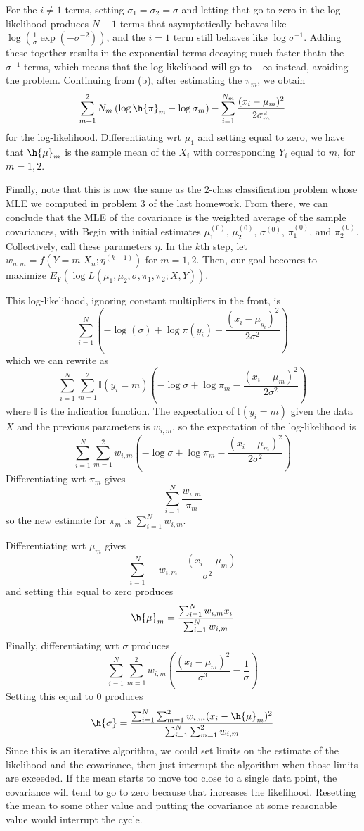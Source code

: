 \documentclass{article}
\begin{document}
For the $i\neq1$ terms, setting $\sigma_1=\sigma_2=\sigma$ and letting that go to zero in the log-likelihood produces $N-1$ terms that asymptotically behaves like $\log\left(\frac{1}{\sigma}\exp(-\sigma^{-2})\right)$, and the $i=1$ term still behaves like $\log\sigma^{-1}$. Adding these together results in the exponential terms decaying much faster thatn the $\sigma^{-1}$ terms, which means that the log-likelihood will go to $-\infty$ instead, avoiding the problem.
Continuing from (b), after estimating the $\pi_m$, we obtain 
\[\sum_{m=1}^2N_m\left(\log\h{\pi}_m-\log\sigma_m\right)-\sum_{i=1}^{N_m}\frac{(x_i-\mu_m)^2}{2\sigma_m^2}\]
for the log-likelihood. Differentiating wrt $\mu_1$ and setting equal to zero, we have that $\h{\mu}_m$ is the sample mean of the $X_i$ with corresponding $Y_i$ equal to $m$, for $m=1,2$.

Finally, note that this is now the same as the $2$-class classification problem whose MLE we computed in problem 3 of the last homework. From there, we can conclude that the MLE of the covariance is the weighted average of the sample covariances, with 
Begin with initial estimates $\mu_1^{(0)}$, $\mu_2^{(0)}$, $\sigma^{(0)}$, $\pi_1^{(0)}$, and $\pi_2^{(0)}$. Collectively, call these parameters $\eta$. In the $k$th step, let $w_{n, m}=f(Y=m|X_n;\eta^{(k-1)})$ for $m=1,2$. Then, our goal becomes to maximize $E_Y(\log L(\mu_1,\mu_2,\sigma,\pi_1,\pi_2;X,Y))$. 

This log-likelihood, ignoring constant multipliers in the front, is 
\[\sum_{i=1}^N\left(-\log(\sigma)+\log\pi(y_i)-\frac{(x_i-\mu_{y_i})^2}{2\sigma^2}\right)\]
which we can rewrite as 
\[\sum_{i=1}^N\sum_{m=1}^2\mathbb{I}(y_i=m)\left(-\log\sigma+\log\pi_m-\frac{(x_i-\mu_m)^2}{2\sigma^2}\right)\]
where $\mathbb{I}$ is the indicatior function. The expectation of $\mathbb{I}(y_i=m)$ given the data $X$ and the previous parameters is $w_{i,m}$, so the expectation of the log-likelihood is
\[\sum_{i=1}^N\sum_{m=1}^2w_{i,m}\left(-\log\sigma+\log\pi_m-\frac{(x_i-\mu_m)^2}{2\sigma^2}\right)\]
Differentiating wrt $\pi_m$ gives 
\[\sum_{i=1}^N\frac{w_{i,m}}{\pi_m}\]
so the new estimate for $\pi_m$ is $\sum_{i=1}^Nw_{i,m}$.

Differentiating wrt $\mu_m$ gives
\[\sum_{i=1}^N-w_{i,m}\frac{-(x_i-\mu_m)}{\sigma^2}\]
and setting this equal to zero produces
\[\h{\mu}_m=\frac{\sum_{i=1}^Nw_{i,m}x_i}{\sum_{i=1}^Nw_{i,m}}\]
Finally, differentiating wrt $\sigma$ produces
\[\sum_{i=1}^N\sum_{m=1}^2w_{i,m}\left(\frac{(x_i-\mu_m)^2}{\sigma^3}-\frac{1}{\sigma}\right)\]
Setting this equal to $0$ produces
\[\h{\sigma}=\frac{\sum_{i=1}^N\sum_{m=1}^2w_{i,m}(x_i-\h{\mu}_m)^2}{\sum_{i=1}^N\sum_{m=1}^2w_{i,m}}\]
Since this is an iterative algorithm, we could set limits on the estimate of the likelihood and the covariance, then just interrupt the algorithm when those limits are exceeded. If the mean starts to move too close to a single data point, the covariance will tend to go to zero because that increases the likelihood. Resetting the mean to some other value and putting the covariance at some reasonable value would interrupt the cycle.
\end{document}
